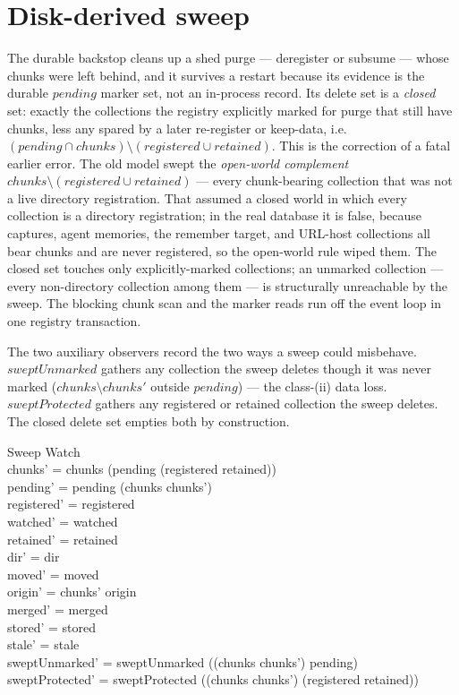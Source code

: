 \documentclass[a4paper]{article}
\begin{document}
\section{Disk-derived sweep}

The durable backstop cleans up a shed purge --- deregister or subsume --- whose
chunks were left behind, and it survives a restart because its evidence is the
durable $pending$ marker set, not an in-process record.  Its delete set is a
\textit{closed} set: exactly the collections the registry explicitly marked for
purge that still have chunks, less any spared by a later re-register or
keep-data, i.e.\ $(pending \cap chunks) \setminus (registered \cup retained)$.
This is the correction of a fatal earlier error.  The old model swept the
\textit{open-world complement} $chunks \setminus (registered \cup retained)$ ---
every chunk-bearing collection that was not a live directory registration.  That
assumed a closed world in which every collection is a directory registration; in
the real database it is false, because captures, agent memories, the remember
target, and URL-host collections all bear chunks and are never registered, so the
open-world rule wiped them.  The closed set touches only explicitly-marked
collections; an unmarked collection --- every non-directory collection among them
--- is structurally unreachable by the sweep.  The blocking chunk scan and the
marker reads run off the event loop in one registry transaction.

The two auxiliary observers record the two ways a sweep could misbehave.
$sweptUnmarked$ gathers any collection the sweep deletes though it was never
marked ($chunks \setminus chunks'$ outside $pending$) --- the class-(ii) data
loss.  $sweptProtected$ gathers any registered or retained collection the sweep
deletes.  The closed delete set empties both by construction.

\begin{schema}{Sweep}
  \Delta Watch \\
  \where
  chunks' = chunks \setminus (pending \setminus (registered \cup retained)) \\
  pending' = pending \setminus (chunks \setminus chunks') \\
  registered' = registered \\
  watched' = watched \\
  retained' = retained \\
  dir' = dir \\
  moved' = moved \\
  origin' = chunks' \dres origin \\
  merged' = merged \\
  stored' = stored \\
  stale' = stale \\
  sweptUnmarked' = sweptUnmarked \cup ((chunks \setminus chunks') \setminus pending) \\
  sweptProtected' = sweptProtected \cup ((chunks \setminus chunks') \cap (registered \cup retained))
\end{schema}
\end{document}
